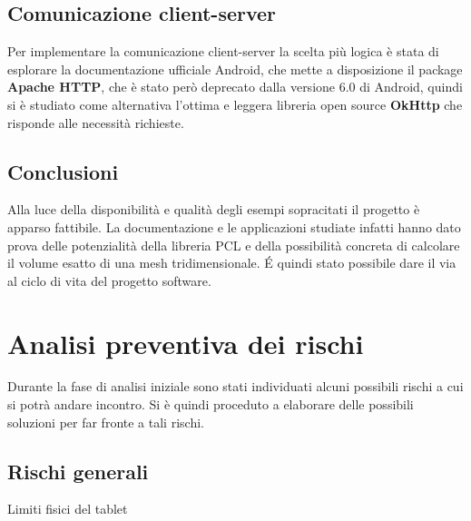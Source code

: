 \subsection{Comunicazione client-server}
Per implementare la comunicazione client-server la scelta più logica è stata di esplorare la documentazione ufficiale Android, che mette a disposizione il package \textbf{Apache HTTP}\cite{site:apache}, che è stato però deprecato dalla versione 6.0 di Android, quindi si è studiato come alternativa l'ottima e leggera libreria open source \textbf{OkHttp}\cite{site:okhttp} che risponde alle necessità richieste.

\subsection{Conclusioni}
Alla luce della disponibilità e qualità degli esempi sopracitati il progetto è apparso fattibile. La documentazione e le applicazioni studiate infatti hanno dato prova delle potenzialità della libreria PCL e della possibilità concreta di calcolare il volume esatto di una mesh tridimensionale. \'E quindi stato possibile dare il via al ciclo di vita del progetto software.


\newpage
\section{Analisi preventiva dei rischi}

Durante la fase di analisi iniziale sono stati individuati alcuni possibili rischi a cui si potrà andare incontro.
Si è quindi proceduto a elaborare delle possibili soluzioni per far fronte a tali rischi.\\

\subsection{Rischi generali}

\begin{risk}{Limiti fisici del tablet}
    \label{risk:device-limits} 
\end{risk}

